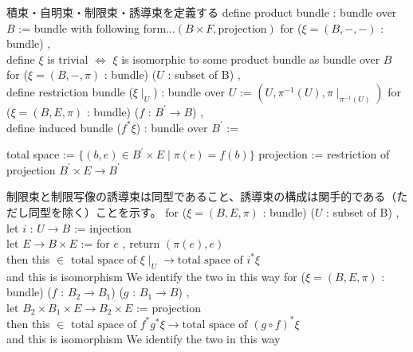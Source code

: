 \begin{Definition}
\itemnote
  積束・自明束・制限束・誘導束を定義する
\itemdefi 
  define product bundle : bundle over \(B\) := bundle with following form...\((B \times F , \text{projection})\)
\itemdefi
  for (\(\xi = (B , - , -)\) : bundle) ,\\
  define \(\xi\) is trivial \(\iff\) \(\xi\) is isomorphic to some product bundle as bundle over \(B\)
\itemdefi
  for (\(\xi = (B , - , \pi)\) : bundle) (\(U\) : subset of B) ,\\
  define restriction bundle (\(\xi \mid_{U}\)) : bundle over \(U\) := \((U , \pi^{-1}(U) , \pi \mid_{\pi^{-1}(U)})\)
\itemdefi
  for (\(\xi = (B , E , \pi)\) : bundle) (\(f\) : \(B^{\prime} \to B\)) ,\\
  define induced bundle (\(f^*\xi\)) : bundle over \(B^{\prime}\) :=
  \begin{itemize}
    \itemenum total space := \(\{(b , e) \in B^{\prime} \times E \mid \pi(e) = f(b)\}\)
    \itemenum projection := restriction of projection \(B^{\prime} \times E \to B^{\prime}\)
  \end{itemize}
\end{Definition}

\begin{Theorem}
\itemnote
  制限束と制限写像の誘導束は同型であること、誘導束の構成は関手的である（ただし同型を除く）ことを示す。
\itemprop
  for (\(\xi = (B , E ,\pi)\) : bundle) (\(U\) : subset of B) ,\\
  let \(i\) : \(U \to B\) := injection \\
  let \(E \to B \times E\) := for \(e\) , return \((\pi(e) , e)\) \\
  then this \(\in\) \(\text{total space of } \xi \mid_{U} \to \text{total space of } i^*\xi\) \\
  and this is isomorphism
\itemdefi
  We identify the two in this way
\itemprop
  for (\(\xi = (B , E , \pi)\) : bundle) (\(f\) : \(B_2 \to B_1\)) (\(g\) : \(B_1 \to B\)) ,\\
  let \(B_2 \times B_1 \times E \to B_2 \times E\) := projection \\
  then this \(\in\) \(\text{total space of } f^*g^* \xi \to \text{total space of } (g \circ f)^* \xi\) \\
  and this is isomorphism
\itemdefi
  We identify the two in this way 
\end{Theorem}

\begin{Proof}
\itemprof
  \ADMIT
\itemprof
  \ADMIT
\end{Proof}

